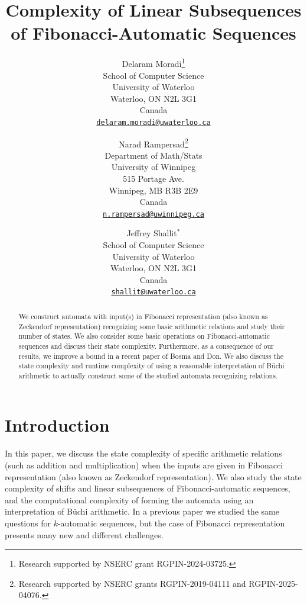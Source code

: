 \documentclass[12pt,reqno]{article}
\title{Complexity of Linear Subsequences of Fibonacci-Automatic Sequences}
\author{Delaram Moradi\footnote{Research supported by NSERC grant RGPIN-2024-03725.}\\
School of Computer Science\\
University of Waterloo\\
Waterloo, ON  N2L 3G1 \\
Canada\\
\href{mailto:delaram.moradi@uwaterloo.ca}{\tt delaram.moradi@uwaterloo.ca}\\
\and
Narad Rampersad\footnote{Research supported by NSERC grants RGPIN-2019-04111 and RGPIN-2025-04076.}\\
Department of Math/Stats\\
University of Winnipeg\\
515 Portage Ave.\\
Winnipeg, MB R3B 2E9\\
Canada\\
\href{mailto:n.rampersad@uwinnipeg.ca}{\tt n.rampersad@uwinnipeg.ca}\\
\and 
Jeffrey Shallit$^*$\\
School of Computer Science\\
University of Waterloo\\
Waterloo, ON  N2L 3G1 \\
Canada\\
\href{mailto:shallit@uwaterloo.ca}{\tt shallit@uwaterloo.ca}}
\begin{document}
\maketitle

\theoremstyle{plain}
\newtheorem{theorem}{Theorem}
\newtheorem{corollary}[theorem]{Corollary}
\newtheorem{lemma}[theorem]{Lemma}
\newtheorem{proposition}[theorem]{Proposition}
\newtheorem{problem}{Problem}

\theoremstyle{definition}
\newtheorem{definition}[theorem]{Definition}
\newtheorem{example}[theorem]{Example}
\newtheorem{conjecture}[theorem]{Conjecture}

\theoremstyle{remark}
\newtheorem{remark}[theorem]{Remark}

\begin{abstract}
We construct automata with input(s) in Fibonacci representation (also known as Zeckendorf representation) recognizing some basic arithmetic relations and study their number of states. 
We also consider some basic operations on Fibonacci-automatic sequences and discuss their state complexity. Furthermore, as a consequence of our results, we improve a bound in a recent paper of Bosma and Don. We also discuss the state complexity and runtime complexity of using a reasonable interpretation of B\"uchi arithmetic to actually construct some of the studied automata recognizing relations.
\end{abstract}

\section{Introduction}

In this paper, we discuss 
the state complexity of specific arithmetic relations (such as addition and multiplication) when the inputs are given in Fibonacci representation (also known as Zeckendorf representation).  We also study the state complexity of shifts and linear subsequences of Fibonacci-automatic sequences, and the computational complexity of forming the automata using an interpretation of B\"uchi arithmetic.  In a previous paper \cite{moradi_complexity_2026} we studied the same questions for $k$-automatic sequences, but the case of
Fibonacci representation presents many new and different challenges.
\end{document}

